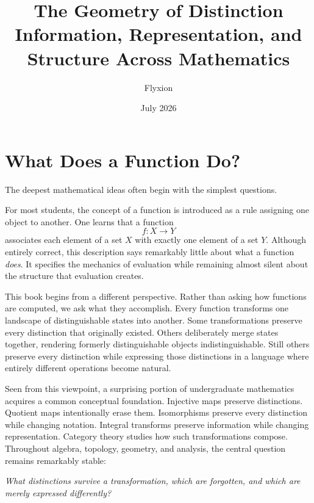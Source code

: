 \documentclass[11pt]{book}
\title{%
The Geometry of Distinction\\
\large Information, Representation, and Structure Across Mathematics
}
\author{Flyxion}
\date{July 2026}
\numberwithin{equation}{chapter}
\theoremstyle{definition}
\theoremstyle{plain}
\theoremstyle{remark}
\begin{document}
\frontmatter

\maketitle

\tableofcontents

\mainmatter


\chapter{What Does a Function Do?}

\epigraph{The deepest mathematical ideas often begin with the simplest questions.}{}

For most students, the concept of a function is introduced as a rule assigning one object to another. One learns that a function
\[
f:X\rightarrow Y
\]
associates each element of a set \(X\) with exactly one element of a set \(Y\). Although entirely correct, this description says remarkably little about what a function \emph{does}. It specifies the mechanics of evaluation while remaining almost silent about the structure that evaluation creates.

This book begins from a different perspective. Rather than asking how functions are computed, we ask what they accomplish. Every function transforms one landscape of distinguishable states into another. Some transformations preserve every distinction that originally existed. Others deliberately merge states together, rendering formerly distinguishable objects indistinguishable. Still others preserve every distinction while expressing those distinctions in a language where entirely different operations become natural.

Seen from this viewpoint, a surprising portion of undergraduate mathematics acquires a common conceptual foundation. Injective maps preserve distinctions. Quotient maps intentionally erase them. Isomorphisms preserve every distinction while changing notation. Integral transforms preserve information while changing representation. Category theory studies how such transformations compose. Throughout algebra, topology, geometry, and analysis, the central question remains remarkably stable:

\begin{center}
\emph{What distinctions survive a transformation, which are forgotten, and which are merely expressed differently?}
\end{center}
\end{document}
